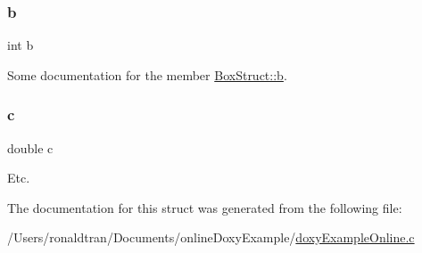 \subsubsection{\texorpdfstring{b}{b}}
{\footnotesize\ttfamily int b}

Some documentation for the member \mbox{\hyperlink{struct_box_struct__struct_a148e3876077787926724625411d6e7a9}{Box\+Struct\+::b}}. \mbox{\label{struct_box_struct__struct_a2c09e929a6ea340fc9653cca414b11d3}} 
\subsubsection{\texorpdfstring{c}{c}}
{\footnotesize\ttfamily double c}

Etc. 

The documentation for this struct was generated from the following file\+:\begin{DoxyCompactItemize}
\item 
/\+Users/ronaldtran/\+Documents/online\+Doxy\+Example/\mbox{\hyperlink{doxy_example_online_8c}{doxy\+Example\+Online.\+c}}\end{DoxyCompactItemize}
